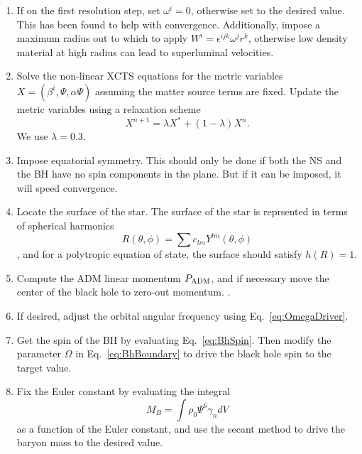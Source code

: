 \begin{enumerate}
\item If on the first resolution step, set $\omega^i=0$, otherwise set to the desired value. This has been found to help with convergence. Additionally, impose a maximum radius out to which to apply $W^i=\epsilon^{ijk}\omega^jr^k$, otherwise low density material at high radius can lead to superluminal velocities.

\item Solve the non-linear XCTS equations for the metric variables
  $X=\left(\beta^i,\Psi,\alpha\Psi\right)$ assuming the matter source
  terms are fixed. Update the metric variables using a relaxation
  scheme
\begin{equation}
X^{n+1}=\lambda X^{*} + (1-\lambda)X^n.
\end{equation}
We use $\lambda=0.3$.

\item Impose equatorial symmetry. This should only be done if both the
  NS and the BH have no spin components in the plane. But if it can be
  imposed, it will speed convergence.

\item Locate the surface of the star. The surface of the star is
  reprsented in terms of spherical harmonics
\begin{equation}
R(\theta,\phi)=\sum c_{lm}Y^{lm}(\theta,\phi)
\end{equation}, and for a polytropic equation of state, the surface
should satisfy $h(R)=1$. 

\item Compute the ADM linear momentum $P_{\rm ADM}$, and if necessary
  move the center of the black hole to zero-out momentum. .

\item If desired, adjust the orbital angular frequency using Eq.~\ref{eq:OmegaDriver}.

\item Get the spin of the BH by evaluating Eq.~\ref{eq:BhSpin}. Then
  modify the parameter $\Omega$ in Eq.~\ref{eq:BhBoundary} to drive
  the black hole spin to the target value.

\item Fix the Euler constant by evaluating the integral
\begin{equation}
M_{B}=\int \rho_0\Psi^6\gamma_ndV
\end{equation}
as a function of the Euler
constant, and use the secant method to drive the baryon mass to the
desired value.


\end{enumerate}
